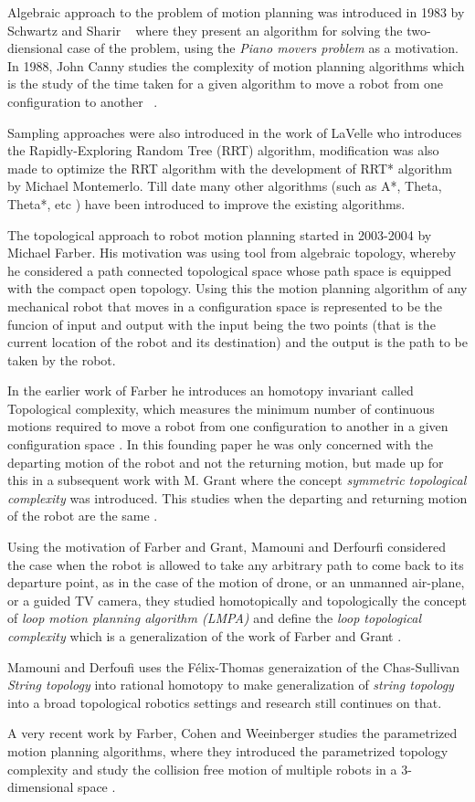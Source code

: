 Algebraic approach to the problem of motion planning was introduced in 1983 by Schwartz and Sharir ~\cite{schwartz:1983a} where they present an algorithm for solving the two-diensional case of the problem, using the \textit{Piano movers problem} as a motivation. In 1988, John Canny studies the complexity of motion planning algorithms which is the study of the time taken for a given algorithm to move a robot from one configuration to another ~\cite{canny1988}. 

Sampling approaches were also introduced in the work of LaVelle who introduces the Rapidly-Exploring Random Tree (RRT) algorithm, modification was also made to optimize the RRT algorithm with the development of RRT* algorithm by Michael Montemerlo. Till date many other algorithms (such as A*, Theta, Theta*, etc ) have been introduced to improve the existing algorithms.

The topological approach to robot motion planning started in 2003-2004 by Michael Farber. His motivation was using tool from algebraic topology, whereby he considered a path connected topological space whose path space is equipped with the compact open topology. Using this the motion planning algorithm of any mechanical robot that moves in a configuration space is represented to be the funcion of input and output with the input being the two points (that is the current location of the robot and its destination) and the output is the path to be taken by the robot.

In the earlier work of Farber he introduces an homotopy invariant called Topological complexity, which measures the minimum number of continuous motions required to move a robot from one configuration to another in a given configuration space \cite{farber2003topological}. In this founding paper he was only concerned with the departing motion of the robot and not the returning motion, but made up for this in a subsequent work with M. Grant where the concept \textit{symmetric topological complexity} was introduced. This studies when the departing and returning motion of the robot are the same \cite{farber2007symmetric}.

Using the motivation of Farber and Grant, Mamouni and Derfourfi considered the case when the robot is allowed to take any arbitrary path to come back to its departure point, as in the case of the motion of drone, or an unmanned air-plane, or a guided TV camera, they studied homotopically and topologically the concept of \textit{loop motion planning algorithm (LMPA)}  and define the \textit{loop topological complexity} which is a generalization of the work of Farber and Grant \cite{mamouni2022pure}.

Mamouni and Derfoufi uses the F\'elix-Thomas generaization of the Chas-Sullivan \textit{String topology} into rational homotopy to make generalization of \textit{string topology} into a broad topological robotics settings and research still continues on that. 

A very recent work by Farber, Cohen and Weeinberger studies the parametrized motion planning algorithms, where they introduced the parametrized topology complexity and study the collision free motion of multiple robots in a 3-dimensional space \cite{cohen2021topology}.


